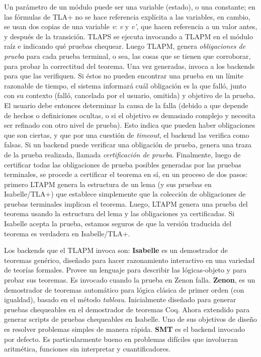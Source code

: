\documentclass[spanish]{llncs}
\begin{document}
  Un parámetro de un módulo puede ser una variable (estado), o una constante; en las fórmulas de TLA+ no se hace referencia explícita a las variables, en cambio, se usan dos copias de una variable \textit{v}: \textit{v} y \textit{v'}, que hacen referencia a un valor antes, y después de la transición. 
  TLAPS se ejecuta invocando a TLAPM en el módulo raíz e indicando qué pruebas chequear. 
  Luego TLAPM, genera \textit{obligaciones de prueba} para cada prueba terminal, o sea, las cosas que se tienen que corroborar, para probar la correctitud del teorema. Una vez generadas, invoca a los backends para que las verifiquen.
  Si éstos no pueden encontrar una prueba en un límite razonable de tiempo, el sistema informará cuál obligación es la que falló, junto con su contexto (falló, cancelada por el usuario, omitida) y objetivo de la prueba.
  El usuario debe entonces determinar la causa de la falla (debido a que depende de hechos o definiciones ocultas, o si el objetivo es demasiado complejo y necesita ser refinado con otro nivel de prueba). Esto indica que pueden haber obligaciones que son ciertas, y que por una cuestión de \textit{timeout},
  el backend las verifica como falsas.
  Si un backend puede verificar una obligación de prueba, genera una traza de la prueba realizada, llamada \textit{certificación de prueba}.
  Finalmente, luego de certificar todas las obligaciones de prueba posibles generadas por las pruebas
  terminales, se procede a certificar el teorema en sí, en un proceso de dos pasos: primero LTAPM genera la estructura de un lema (y sus pruebas en Isabelle/TLA+) que establece simplemente que la colección de
  obligaciones de pruebas terminales implican el teorema. Luego, LTAPM genera una prueba del teorema usando la estructura del lema y las obligaciones ya certificadas. Si Isabelle acepta la prueba, estamos seguros de que la versión traducida del teorema es verdadera en Isabelle/TLA+.\cite{verifyingsafety}

  Los backends que el TLAPM invoca son: \textbf{Isabelle} es un demostrador de teoremas genérico, diseñado para hacer razonamiento interactivo en una variedad de teorías formales. Provee un lenguaje para describir las lógicas-objeto y para probar sus teoremas. Es invocado cuando la prueba en Zenon falla\cite{verifyingsafety}.
  \textbf{Zenon}, es un demostrador de teoremas automático para lógica clásica de primer orden (con igualdad), 
  basado en el método \textit{tableau}. Inicialmente diseñado para generar pruebas chequeables en el demostrador de teoremas Coq. Ahora extendido para generar scripts de pruebas chequeables en Isabelle. Uno de sus objetivos de diseño es resolver problemas simples de manera rápida\cite{zenon}. \textbf{SMT} es el backend invocado por defecto. Es particularmente bueno en problemas difíciles que involucran aritmética, funciones sin interpretar y cuantificadores.\cite{formaltech}
  \\
  
\end{document}
